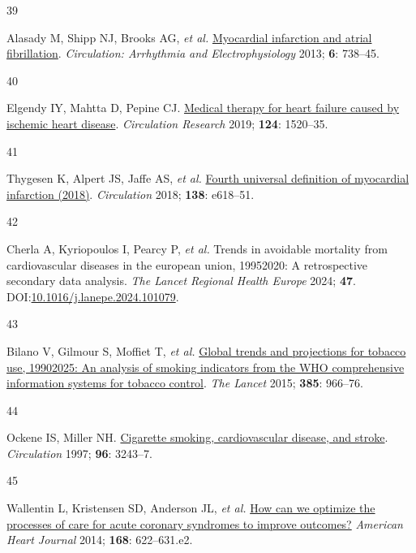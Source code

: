 \documentclass[
  letterpaper,
  headsepline=true,
  open=any]{scrbook}
\newlength{\cslhangindent}
\newlength{\csllabelwidth}
\newlength{\cslentryspacingunit} %
\newenvironment{CSLReferences}[2] %
 {%
  \setlength{\parindent}{0pt}
  \ifodd #1
  \let\oldpar\par
  \def\par{\hangindent=\cslhangindent\oldpar}
  \fi
  \setlength{\parskip}{#2\cslentryspacingunit}
 }%
 {}
\newcommand{\CSLLeftMargin}[1]{\parbox[t]{\csllabelwidth}{#1}}
\newcommand{\CSLRightInline}[1]{\parbox[t]{\linewidth - \csllabelwidth}{#1}\break}
\begin{document}
\begin{CSLReferences}{0}{0}
\leavevmode{}%
\CSLLeftMargin{39 }%
\CSLRightInline{Alasady M, Shipp NJ, Brooks AG, \emph{et al.}
\href{https://doi.org/10.1161/CIRCEP.113.000163}{Myocardial infarction
and atrial fibrillation}. \emph{Circulation: Arrhythmia and
Electrophysiology} 2013; \textbf{6}: 738--45.}

\leavevmode{}%
\CSLLeftMargin{40 }%
\CSLRightInline{Elgendy IY, Mahtta D, Pepine CJ.
\href{https://doi.org/10.1161/CIRCRESAHA.118.313568}{Medical therapy for
heart failure caused by ischemic heart disease}. \emph{Circulation
Research} 2019; \textbf{124}: 1520--35.}

\leavevmode{}%
\CSLLeftMargin{41 }%
\CSLRightInline{Thygesen K, Alpert JS, Jaffe AS, \emph{et al.}
\href{https://doi.org/10.1161/CIR.0000000000000617}{Fourth universal
definition of myocardial infarction (2018)}. \emph{Circulation} 2018;
\textbf{138}: e618--51.}

\leavevmode{}%
\CSLLeftMargin{42 }%
\CSLRightInline{Cherla A, Kyriopoulos I, Pearcy P, \emph{et al.} Trends
in avoidable mortality from cardiovascular diseases in the european
union, 1995{\textendash}2020: A retrospective secondary data analysis.
\emph{The Lancet Regional Health {\textendash} Europe} 2024;
\textbf{47}.
DOI:\href{https://doi.org/10.1016/j.lanepe.2024.101079}{10.1016/j.lanepe.2024.101079}.}

\leavevmode{}%
\CSLLeftMargin{43 }%
\CSLRightInline{Bilano V, Gilmour S, Moffiet T, \emph{et al.}
\href{https://doi.org/10.1016/S0140-6736(15)60264-1}{Global trends and
projections for tobacco use, 1990{\textendash}2025: An analysis of
smoking indicators from the WHO comprehensive information systems for
tobacco control}. \emph{The Lancet} 2015; \textbf{385}: 966--76.}

\leavevmode{}%
\CSLLeftMargin{44 }%
\CSLRightInline{Ockene IS, Miller NH.
\href{https://doi.org/10.1161/01.CIR.96.9.3243}{Cigarette smoking,
cardiovascular disease, and stroke}. \emph{Circulation} 1997;
\textbf{96}: 3243--7.}

\leavevmode{}%
\CSLLeftMargin{45 }%
\CSLRightInline{Wallentin L, Kristensen SD, Anderson JL, \emph{et al.}
\href{https://doi.org/10.1016/j.ahj.2014.07.006}{How can we optimize the
processes of care for acute coronary syndromes to improve outcomes?}
\emph{American Heart Journal} 2014; \textbf{168}: 622--631.e2.}


\end{CSLReferences}
\end{document}
